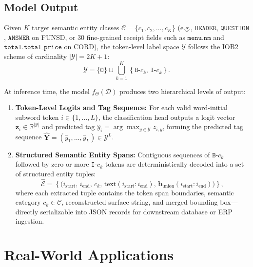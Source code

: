 \subsection{Model Output}
Given $K$ target semantic entity classes $\mathcal{C} = \{c_1, c_2, \dots, c_K\}$ (e.g., $\texttt{HEADER}$, $\texttt{QUESTION}$, $\texttt{ANSWER}$ on FUNSD, or 30 fine-grained receipt fields such as $\texttt{menu.nm}$ and $\texttt{total.total\_price}$ on CORD), the token-level label space $\mathcal{Y}$ follows the IOB2 scheme of cardinality $|\mathcal{Y}| = 2K + 1$:
\begin{equation}
    \mathcal{Y} = \{\texttt{O}\} \cup \bigcup_{k=1}^{K} \left\{ \texttt{B-}c_k, \, \texttt{I-}c_k \right\}.
\end{equation}

At inference time, the model $f_{\Theta}(\mathcal{D})$ produces two hierarchical levels of output:
\begin{enumerate}
    \item \textbf{Token-Level Logits and Tag Sequence:} For each valid word-initial subword token $i \in \{1, \dots, L\}$, the classification head outputs a logit vector $\mathbf{z}_i \in \mathbb{R}^{|\mathcal{Y}|}$ and predicted tag $\hat{y}_i = \arg\max_{y \in \mathcal{Y}} z_{i,y}$, forming the predicted tag sequence $\hat{\mathbf{Y}} = (\hat{y}_1, \dots, \hat{y}_L) \in \mathcal{Y}^L$.
    \item \textbf{Structured Semantic Entity Spans:} Contiguous sequences of $\texttt{B-}c_k$ followed by zero or more $\texttt{I-}c_k$ tokens are deterministically decoded into a set of structured entity tuples:
    \begin{equation}
        \hat{\mathcal{E}} = \left\{ \big( i_{\text{start}}, \, i_{\text{end}}, \, c_k, \, \text{text}(i_{\text{start}}:i_{\text{end}}), \, \mathbf{b}_{\text{union}}(i_{\text{start}}:i_{\text{end}}) \big) \right\},
    \end{equation}
    where each extracted tuple contains the token span boundaries, semantic category $c_k \in \mathcal{C}$, reconstructed surface string, and merged bounding box—directly serializable into JSON records for downstream database or ERP ingestion.
\end{enumerate}

\section{Real-World Applications}
\label{sec:real_world_applications}

